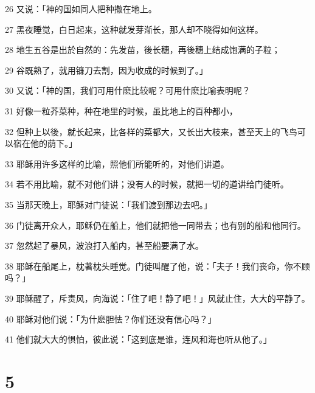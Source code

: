 \par 26 又说：「神的国如同人把种撒在地上。
\par 27 黑夜睡觉，白日起来，这种就发芽渐长，那人却不晓得如何这样。
\par 28 地生五谷是出於自然的：先发苗，後长穗，再後穗上结成饱满的子粒；
\par 29 谷既熟了，就用镰刀去割，因为收成的时候到了。」
\par 30 又说：「神的国，我们可用什麽比较呢？可用什麽比喻表明呢？
\par 31 好像一粒芥菜种，种在地里的时候，虽比地上的百种都小，
\par 32 但种上以後，就长起来，比各样的菜都大，又长出大枝来，甚至天上的飞鸟可以宿在他的荫下。」
\par 33 耶稣用许多这样的比喻，照他们所能听的，对他们讲道。
\par 34 若不用比喻，就不对他们讲；没有人的时候，就把一切的道讲给门徒听。
\par 35 当那天晚上，耶稣对门徒说：「我们渡到那边去吧。」
\par 36 门徒离开众人，耶稣仍在船上，他们就把他一同带去；也有别的船和他同行。
\par 37 忽然起了暴风，波浪打入船内，甚至船要满了水。
\par 38 耶稣在船尾上，枕著枕头睡觉。门徒叫醒了他，说：「夫子！我们丧命，你不顾吗？」
\par 39 耶稣醒了，斥责风，向海说：「住了吧！静了吧！」风就止住，大大的平静了。
\par 40 耶稣对他们说：「为什麽胆怯？你们还没有信心吗？」
\par 41 他们就大大的惧怕，彼此说：「这到底是谁，连风和海也听从他了。」

\chapter{5}

